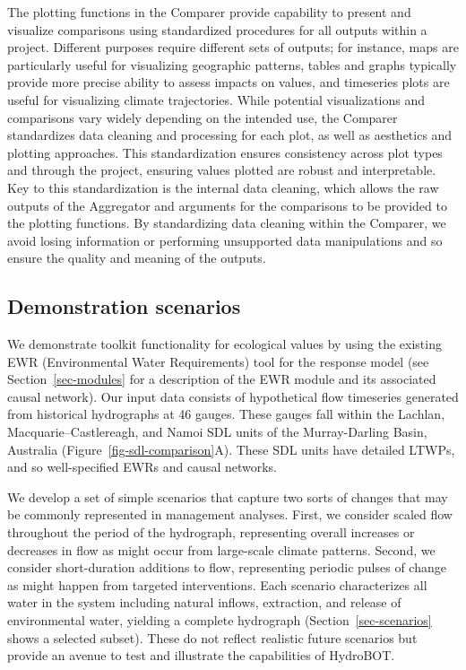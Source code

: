 \documentclass[
  number]{elsarticle}
\begin{document}
The plotting functions in the Comparer provide capability to present and
visualize comparisons using standardized procedures for all outputs
within a project. Different purposes require different sets of outputs;
for instance, maps are particularly useful for visualizing geographic
patterns, tables and graphs typically provide more precise ability to
assess impacts on values, and timeseries plots are useful for
visualizing climate trajectories. While potential visualizations and
comparisons vary widely depending on the intended use, the Comparer
standardizes data cleaning and processing for each plot, as well as
aesthetics and plotting approaches. This standardization ensures
consistency across plot types and through the project, ensuring values
plotted are robust and interpretable. Key to this standardization is the
internal data cleaning, which allows the raw outputs of the Aggregator
and arguments for the comparisons to be provided to the plotting
functions. By standardizing data cleaning within the Comparer, we avoid
losing information or performing unsupported data manipulations and so
ensure the quality and meaning of the outputs.

\hypertarget{demonstration-scenarios}{%
\subsection{Demonstration scenarios}\label{demonstration-scenarios}}

We demonstrate toolkit functionality for ecological values by using the
existing EWR (Environmental Water Requirements) tool for the response
model (see Section~\ref{sec-modules} for a description of the EWR module
and its associated causal network). Our input data consists of
hypothetical flow timeseries generated from historical hydrographs at 46
gauges. These gauges fall within the Lachlan, Macquarie--Castlereagh,
and Namoi SDL units of the Murray-Darling Basin, Australia
(Figure~\ref{fig-sdl-comparison}A). These SDL units have detailed LTWPs,
and so well-specified EWRs and causal networks.

We develop a set of simple scenarios that capture two sorts of changes
that may be commonly represented in management analyses. First, we
consider scaled flow throughout the period of the hydrograph,
representing overall increases or decreases in flow as might occur from
large-scale climate patterns. Second, we consider short-duration
additions to flow, representing periodic pulses of change as might
happen from targeted interventions. Each scenario characterizes all
water in the system including natural inflows, extraction, and release
of environmental water, yielding a complete hydrograph
(Section~\ref{sec-scenarios} shows a selected subset). These do not
reflect realistic future scenarios but provide an avenue to test and
illustrate the capabilities of HydroBOT.
\end{document}
